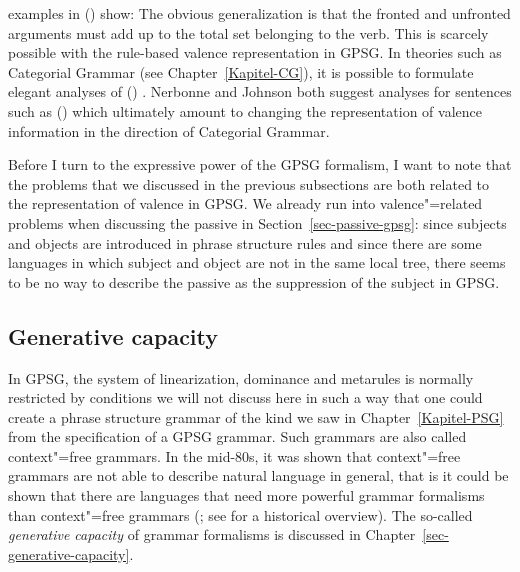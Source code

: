 examples in () show:
\eal
{}
\zl
The obvious generalization is that the fronted and unfronted arguments must add up to the total
set belonging to the verb. This is scarcely possible with the rule-based valence
representation in GPSG. In theories such as Categorial Grammar (see
Chapter~\ref{Kapitel-CG}), it is possible to formulate elegant analyses of ()
\citep{Geach70a}. Nerbonne and Johnson both suggest analyses for sentences such as () which
ultimately amount to changing the representation of valence information in the direction of
Categorial Grammar. 

Before I turn to the expressive power of the GPSG formalism, I want to note that the problems that
we discussed in the previous subsections are both related to the representation of valence in GPSG. We
already run into valence"=related problems when discussing the passive in Section~\ref{sec-passive-gpsg}: since subjects and objects are introduced in
phrase structure rules and since there are some languages in which subject and object are not in the
same local tree, there seems to be no way to describe the passive as the suppression of the subject
in GPSG.

\subsection{Generative capacity}

In GPSG, the system of linearization, dominance and metarules is normally restricted by conditions
we will not discuss here in such a way that one could create a phrase structure grammar of the kind
we saw in Chapter~\ref{Kapitel-PSG} from the specification of a GPSG grammar. Such grammars are also called
context"=free grammars. In the mid-80s, it was
shown that context"=free grammars are not able to describe natural language in general, that is it
could be shown that there are languages that need more powerful grammar formalisms than
context"=free grammars (\citealp{Shieber85a,Culy85a}; see  for a historical
overview). The so-called \emph{generative capacity} of grammar formalisms is discussed in
Chapter~\ref{sec-generative-capacity}.


